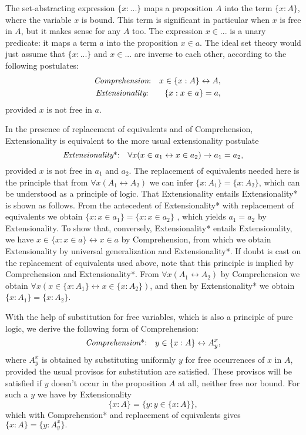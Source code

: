 The set-abstracting expression $\{x:...\}$ maps a proposition $A$ into the
term $\{x:A\}$, where the variable $x$ is bound. This term is significant in
particular when $x$ is free in $A$, but it makes sense for any $A$ too. The
expression $x\in ...$ is a unary predicate: it maps a term $a$ into the
proposition $x\in a$. The ideal set theory would just assume that $\{x:...\}$
and $x\in ...$ are inverse to each other, according to the following
postulates: 
\begin{eqnarray*}
&&\text{{\it Comprehension}:\quad }x\in \{x:A\}\leftrightarrow A, \\
&&\text{{\it Extensionality}:\qquad }\{x:x\in a\}=a,
\end{eqnarray*}
provided $x$ is not free in $a$.

In the presence of replacement of equivalents and of Comprehension,
Extensionality is equivalent to the more usual extensionality postulate 
\[
\text{{\it Extensionality}*:\quad }\forall x(x\in a_{1}\leftrightarrow x\in
a_{2})\rightarrow a_{1}=a_{2}, 
\]
provided $x$ is not free in $a_{1}$ and $a_{2}$. The replacement of
equivalents needed here is the principle that from $\forall
x(A_{1}\leftrightarrow A_{2})$ we can infer $\{x:A_{1}\}=\{x:A_{2}\}$, which
can be understood as a principle of logic. That Extensionality entails
Extensionality* is shown as follows. From the antecedent of Extensionality*
with replacement of equivalents we obtain $\{x:x\in a_{1}\}=\{x:x\in a_{2}\}$%
, which yields $a_{1}=a_{2}$ by Extensionality. To show that, conversely,
Extensionality* entails Extensionality, we have $x\in \{x:x\in
a\}\leftrightarrow x\in a$ by Comprehension, from which we obtain
Extensionality by universal generalization and Extensionality*. If doubt is
cast on the replacement of equivalents used above, note that this principle
is implied by Comprehension and Extensionality*. From $\forall
x(A_{1}\leftrightarrow A_{2})$ by Comprehension we obtain $\forall x(x\in
\{x:A_{1}\}\leftrightarrow x\in \{x:A_{2}\})$, and then by Extensionality*
we obtain $\{x:A_{1}\}=\{x:A_{2}\}$.

With the help of substitution for free variables, which is also a principle
of pure logic, we derive the following form of Comprehension: 
\[
\text{{\it Comprehension}*:\quad }y\in \{x:A\}\leftrightarrow A_{y}^{x}, 
\]
where $A_{y}^{x}$ is obtained by substituting uniformly $y$ for free
occurrences of $x$ in $A$, provided the usual provisos for substitution are
satisfied. These provisos will be satisfied if $y$ doesn't occur in the
proposition $A$ at all, neither free nor bound. For such a $y$ we have by
Extensionality 
\[
\{x:A\}=\{y:y\in \{x:A\}\}, 
\]
which with Comprehension* and replacement of equivalents gives $%
\{x:A\}=\{y:A_{y}^{x}\}.$

